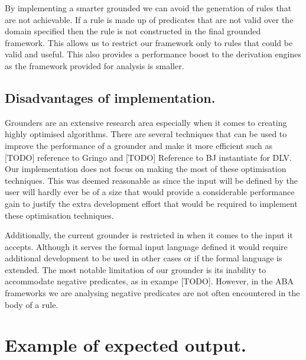 By implementing a smarter grounded we can avoid the generation of rules that are not achievable. If a rule is made up of predicates that are not valid over the domain specified then the rule is not constructed in the final grounded framework. This allows us to restrict our framework only to rules that could be valid and useful. This also provides a performance boost to the derivation engines as the framework provided for analysis is smaller.

\subsection{Disadvantages of implementation.}

Grounders are an extensive research area especially when it comes to creating highly optimised algorithms. There are several techniques that can be used to improve the performance of a grounder and make it more efficient such as [TODO] reference to Gringo and [TODO] Reference to BJ instantiate for DLV. Our implementation does not focus on making the most of these optimisation techniques. This was deemed reasonable as since the input will be defined  by the user will hardly ever be of a size that would provide a considerable performance gain to justify the extra development effort that would be required to implement these optimisation techniques.

Additionally, the current grounder is restricted in when it comes to the input it accepts. Although it serves the formal input language defined it would require additional development to be used in other cases or if the formal language is extended. The most notable limitation of our grounder is its inability to accommodate negative predicates, as in exampe [TODO]. However, in the ABA frameworks we are analysing negative predicates are not often encountered in the body of a rule.

\section{Example of expected output.}